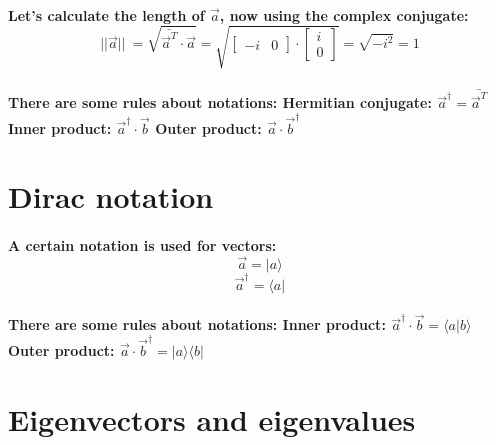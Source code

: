 \documentclass[11pt]{report}
\begin{document}
    \paragraph{
    Let's calculate the length of \(\vec{a}\), now using the complex conjugate:
    \[\lvert\lvert\vec{a}\lvert\lvert\ = \sqrt{\bar{\vec{a}^T} \cdot \vec{a} } = \sqrt{\begin{bmatrix} -i & 0 \end{bmatrix} \cdot \begin{bmatrix} i \\ 0 \end{bmatrix}} = \sqrt{-i^2} = 1\]
    }

    \paragraph{
    There are some rules about notations: \newline
    Hermitian conjugate: \(\vec{a}^\dagger = \bar{\vec{a}^T}\) \newline
    Inner product: \(\vec{a}^\dagger \cdot \vec{b}\) \newline
    Outer product: \(\vec{a} \cdot \vec{b}^\dagger\) \newline
    }

    \newpage

    \section{Dirac notation}

    \paragraph{
    A certain notation is used for vectors: \[ \vec{a} = |a\rangle\] \[ \vec{a}^\dagger = \langle a |\]}

    \paragraph{
    There are some rules about notations: \newline
    Inner product: \(\vec{a}^\dagger \cdot \vec{b} = \langle a | b \rangle\) \newline
    Outer product: \(\vec{a} \cdot \vec{b}^\dagger = | a \rangle\langle b |\) \newline
    }

    \section*{Eigenvectors and eigenvalues}
\end{document}
